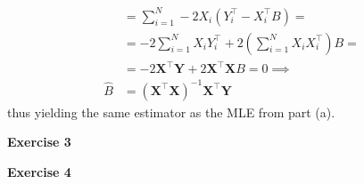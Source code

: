 \documentclass[10pt,notitlepage]{article}
\newcommand{\MBlue}[1]{{\color{MBlue}#1}}
\newcommand{\Xv}{\mathbf{X}}
\newcommand{\Yv}{\mathbf{Y}}
\begin{document}
\begin{exercise}[Solution]
\begin{enumerate}[(a)]
\begin{align*}
                        &= \sum_{i=1}^{N}-2 X_i \left(Y_i^\top - X_i^\top B\right) = \\
                        &= -2\sum_{i=1}^{N}X_i Y_i^\top + 2 \left(\sum_{i=1}^{N} X_i X_i^\top\right) B = \\
                        &= -2 \Xv^\top\Yv + 2 \Xv^\top\Xv B = 0 \implies\\
                        \hat{B} &= \left(\Xv^\top\Xv\right)^{-1}\Xv^\top\Yv
                    \end{align*}
                    thus yielding the same estimator as the MLE from part (a).
        \end{enumerate}
    \end{exercise}

    \newpage
    \textbf{\large \MBlue{Exercise 3}}
    \vskip10pt
    \noindent
	\begin{exercise}[Solution]

    \end{exercise}

    \newpage
    \textbf{\large \MBlue{Exercise 4}}
    \vskip10pt
    \noindent
	\begin{exercise}[Solution]

    \end{exercise}
\end{document}
